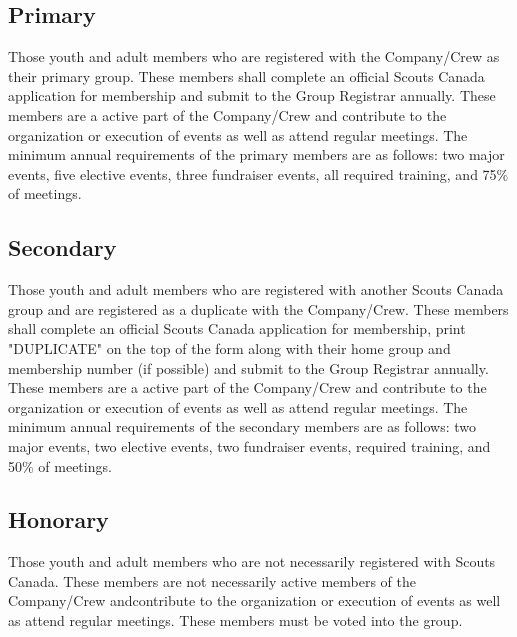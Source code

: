 \documentclass{Service_Corps_Document}
\begin{document}
\subsection{Primary}
Those youth and adult members who are registered with the Company/Crew as their primary group. These members shall complete an official Scouts Canada application for membership and submit to the Group Registrar annually. These members are a active part of the Company/Crew and contribute to the organization or execution of events as well as attend regular meetings. The minimum annual requirements of the primary members are as follows: two major events, five elective events, three fundraiser events, all required training, and 75\% of meetings.
\subsection{Secondary}
Those youth and adult members who are registered with another Scouts Canada group and are registered as a duplicate with the Company/Crew. These members shall complete an official Scouts Canada application for membership, print "DUPLICATE" on the top of the form along with their home group and membership number (if possible) and submit to the Group Registrar annually. These members are a active part of the Company/Crew and contribute to the organization or execution of events as well as attend regular meetings. The minimum annual requirements of the secondary members are as follows: two major events, two elective events, two fundraiser events, required training, and 50\% of meetings. 
\subsection{Honorary}
Those youth and adult members who are not necessarily registered with Scouts Canada. These members are not necessarily active members of the Company/Crew andcontribute to the organization or execution of events as well as attend regular meetings. These members must be voted into the group. 
\end{document}
